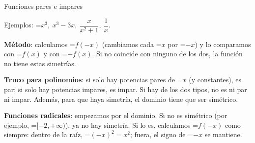 \documentclass[11pt,a4paper]{article}
\newcommand{\fmm}[1]{\setbox0=\hbox{$#1$}\ifdim\wd0>\linewidth\[#1\]\else\mbox{\box0}\fi}
\newcommand{\fmuline}[1]{\textbf{\color{fmaccent}#1}}
\begin{document}
\begin{fmdef}{Funciones pares e impares}
\begin{minipage}[t]{0.48\linewidth}
Ejemplos: \fmm{x^3,\ x^3-3x,\ \dfrac{x}{x^2+1},\ \dfrac{1}{x}}.\end{minipage}\hfill\begin{minipage}[t]{0.48\linewidth}\vspace{0pt}\raggedright \begin{center}\end{center}\end{minipage}\par\medskip

      

\fmuline{Método}: calculamos \fmm{f(-x)} (cambiamos cada \fmm{x} por \fmm{-x}) y lo comparamos con \fmm{f(x)} y con \fmm{-f(x)}. Si no coincide con ninguno de los dos, la función no tiene estas simetrías.

      
\begin{fmnote}\fmuline{Truco para polinomios}: si solo hay potencias pares de \fmm{x} (y constantes), es par; si solo hay potencias impares, es impar. Si hay de los dos tipos, no es ni par ni impar. Además, para que haya simetría, el dominio tiene que ser simétrico.\end{fmnote}

      
\begin{fmnote}\fmuline{Funciones radicales}: empezamos por el dominio. Si no es simétrico (por ejemplo, \fmm{[-2,+\infty)}), ya no hay simetría. Si lo es, calculamos \fmm{f(-x)} como siempre: dentro de la raíz, \fmm{(-x)^2=x^2}; fuera, el signo de \fmm{-x} se mantiene.\end{fmnote}
\end{fmdef}
\end{document}
